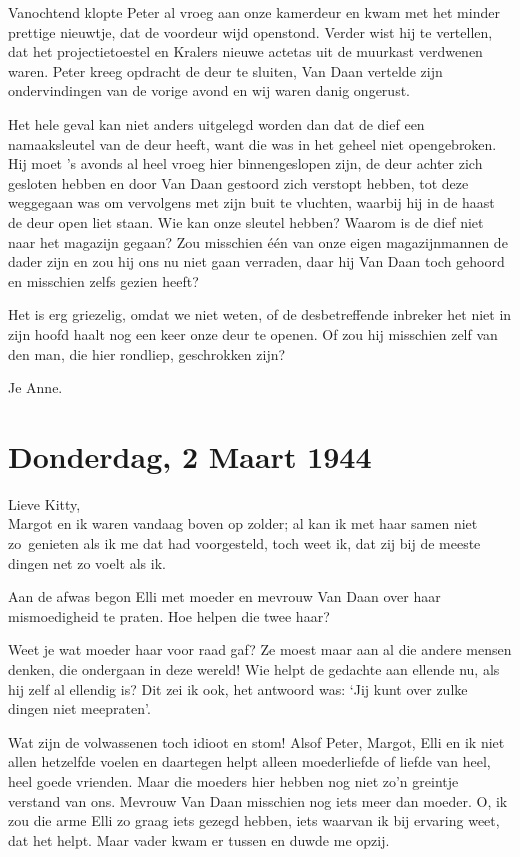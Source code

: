 \documentclass{book}
\begin{document}
Vanochtend klopte Peter al vroeg aan onze kamerdeur en kwam met het
minder prettige nieuwtje, dat de voordeur wijd openstond. Verder wist
hij te vertellen, dat het projectietoestel en Kralers nieuwe actetas uit
de muurkast verdwenen waren. Peter kreeg opdracht de deur te sluiten,
Van Daan vertelde zijn ondervindingen van de vorige avond en wij waren
danig ongerust.

Het hele geval kan niet anders uitgelegd worden dan dat de dief een
namaaksleutel van de deur heeft, want die was in het geheel niet
opengebroken. Hij moet 's avonds al heel vroeg hier binnengeslopen zijn,
de deur achter zich gesloten hebben en door Van Daan gestoord zich
verstopt hebben, tot deze weggegaan was om vervolgens met zijn buit te
vluchten, waarbij hij in de haast de deur open liet staan. Wie kan onze
sleutel hebben? Waarom is de dief niet naar het magazijn gegaan? Zou
misschien één van onze eigen magazijnmannen de dader zijn en zou hij ons
nu niet gaan verraden, daar hij Van Daan toch gehoord en misschien zelfs
gezien heeft?

Het is erg griezelig, omdat we niet weten, of de desbetreffende inbreker
het niet in zijn hoofd haalt nog een keer onze deur te openen. Of zou
hij misschien zelf van den man, die hier rondliep, geschrokken zijn?

Je Anne.

\chapter{Donderdag, 2 Maart 1944}

Lieve Kitty,\\Margot en ik waren vandaag boven op zolder; al kan ik met
haar samen niet zo~genieten als ik me dat had voorgesteld, toch weet ik,
dat zij bij de meeste dingen net zo voelt als ik.

Aan de afwas begon Elli met moeder en mevrouw Van Daan over haar
mismoedigheid te praten. Hoe helpen die twee haar?

Weet je wat moeder haar voor raad gaf? Ze moest maar aan al die andere
mensen denken, die ondergaan in deze wereld! Wie helpt de gedachte aan
ellende nu, als hij zelf al ellendig is? Dit zei ik ook, het antwoord
was: `Jij kunt over zulke dingen niet meepraten'.

Wat zijn de volwassenen toch idioot en stom! Alsof Peter, Margot, Elli
en ik niet allen hetzelfde voelen en daartegen helpt alleen moederliefde
of liefde van heel, heel goede vrienden. Maar die moeders hier hebben
nog niet zo'n greintje verstand van ons. Mevrouw Van Daan misschien nog
iets meer dan moeder. O, ik zou die arme Elli zo graag iets gezegd
hebben, iets waarvan ik bij ervaring weet, dat het helpt. Maar vader
kwam er tussen en duwde me opzij.
\end{document}
